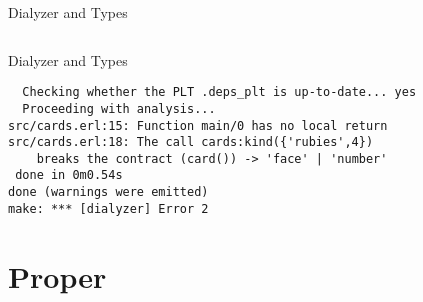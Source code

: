 \documentclass{beamer}
\begin{document}
\begin{frame}{Dialyzer and Types}

  \inputminted[firstline=11]{erlang}{src/cards.erl}

\end{frame}

\begin{frame}[fragile]{Dialyzer and Types}

  \begin{verbatim}
  Checking whether the PLT .deps_plt is up-to-date... yes
  Proceeding with analysis...
src/cards.erl:15: Function main/0 has no local return
src/cards.erl:18: The call cards:kind({'rubies',4})
    breaks the contract (card()) -> 'face' | 'number'
 done in 0m0.54s
done (warnings were emitted)
make: *** [dialyzer] Error 2
  \end{verbatim}

\end{frame}

\section{Proper}
\end{document}
